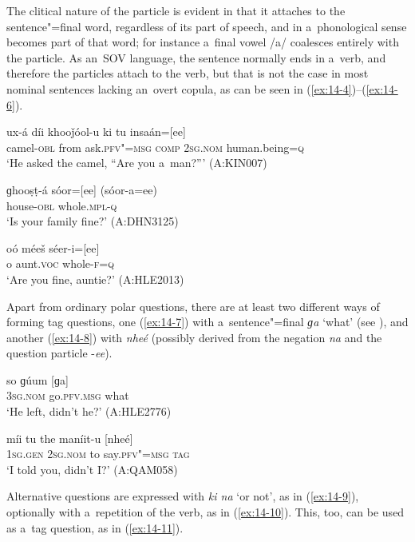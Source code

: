 The clitical nature of the particle is evident in that it attaches to the sentence"=final word, regardless of its part of speech, and in a~phonological sense becomes part of that word; for instance a~final vowel /a/ coalesces entirely with the particle. As an~SOV language, the sentence normally ends in a~verb, and therefore the particles attach to the verb, but that is not the case in most nominal sentences lacking an~overt copula, as can be seen in (\ref{ex:14-4})--(\ref{ex:14-6}).

\begin{exe}
\ex
\label{ex:14-4}
\gll ux-á díi khooǰóol-u ki tu insaán=[ee] \\
camel-\textsc{obl} from ask.\textsc{pfv"=msg} \textsc{comp} \textsc{2sg.nom} human.being=\textsc{q} \\
\glt `He asked the camel, ``Are you a~man?''' (A:KIN007)

\ex
\label{ex:14-5}
\gll ɡhooṣṭ-á sóor=[ee] (sóor-a=ee) \\
house-\textsc{obl} whole.\textsc{mpl-q} \\
\glt `Is your family fine?' (A:DHN3125)

\ex
\label{ex:14-6}
\gll oó méeš séer-i=[ee] \\
o aunt.\textsc{voc} whole-\textsc{f=q} \\
\glt `Are you fine, auntie?' (A:HLE2013)
\end{exe}

Apart from ordinary polar questions, there are at least two different ways of forming tag questions, one (\ref{ex:14-7}) with a~sentence"=final \textit{ɡa} `what' (see ), and another (\ref{ex:14-8}) with \textit{nheé} (possibly derived from the negation \textit{na} and the question particle -\textit{ee}).

\begin{exe}
\ex
\label{ex:14-7}
\gll so ɡúum [ɡa] \\
\textsc{3sg.nom} go.\textsc{pfv.msg} what \\
\glt `He left, didn't he?' (A:HLE2776)

\ex
\label{ex:14-8}
\gll míi tu the maníit-u [nheé] \\
\textsc{1sg.gen} \textsc{2sg.nom} to say.\textsc{pfv"=msg} \textsc{tag} \\
\glt `I told you, didn't I?' (A:QAM058)
\end{exe}

Alternative questions are expressed with \textit{ki na} `or not', as in (\ref{ex:14-9}), optionally with a~repetition of the verb, as in (\ref{ex:14-10}). This, too, can be used as a~tag question, as in (\ref{ex:14-11}).

